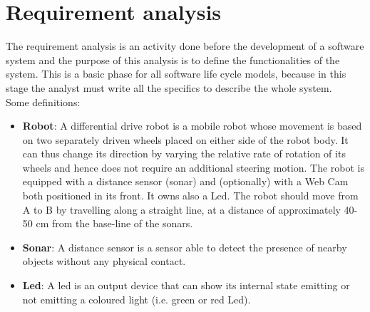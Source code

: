 \section{Requirement analysis}
The requirement analysis is an activity done before the development of a software system and the purpose of this analysis is to define the functionalities of the system. This is a basic phase for all software life cycle models, because in this stage the analyst must write all the specifics to describe the whole system. \\
Some definitions:
\begin{itemize}
	\item \textbf{Robot}: A differential drive robot is a mobile robot whose movement is based on two separately driven wheels placed on either side of the robot body. It can thus change its direction by varying the relative rate of rotation of its wheels and hence does not require an additional steering motion. The robot is equipped with a distance sensor (sonar) and (optionally) with a Web Cam both positioned in its front. It owns also a Led. The robot should move from A to B by travelling along a straight line, at a distance of approximately 40-50 cm from the base-line of the sonars.
	\item \textbf{Sonar}: A distance sensor is a sensor able to detect the presence of nearby objects without any physical contact.
	\item \textbf{Led}: A led is an output device that can show its internal state emitting or not emitting a coloured light (i.e. green or red Led).
\end{itemize}



